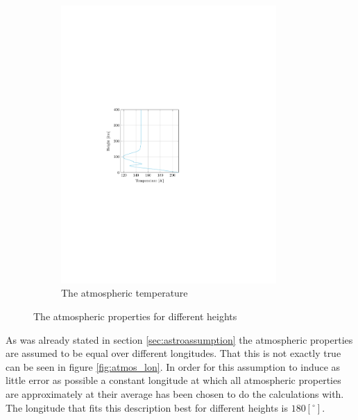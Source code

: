 \begin{figure}[ht!]
\begin{subfigure}{0.45\textwidth}
	\includegraphics[trim={4cm 9.8cm 9cm 10cm},clip,width=0.9\textwidth]{Figure/atmos_model/temperature.pdf}
	\caption{The atmospheric temperature}
	\label{fig:atmos_height_T}
	\end{subfigure}
	\caption{The atmospheric properties for different heights}
	\label{fig:atmos_height}
\end{figure}

As was already stated in section \ref{sec:astroassumption} the atmospheric properties are assumed to be equal over different longitudes. That this is not exactly true can be seen in figure \ref{fig:atmos_lon}. In order for this assumption to induce as little error as possible a constant longitude at which all atmospheric properties are approximately at their average has been chosen to do the calculations with. The longitude that fits this description best for different heights is $180 \left[^\circ\right]$.

